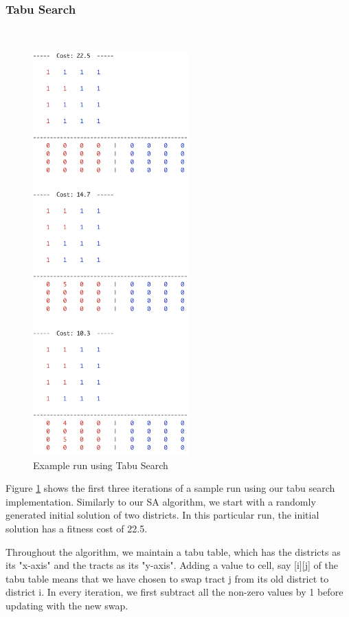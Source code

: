 \documentclass[journal]{IEEEtran}
\begin{document}
\subsubsection{Tabu Search}~\\
\begin{figure}[h!]
    \includegraphics[width=6cm]{tabu.png}
    \centering
    \caption{Example run using Tabu Search}
        \label{fig:tabu_example}
\end{figure}
Figure \ref{fig:tabu_example} shows the first three iterations of a sample run using our tabu search implementation. Similarly to our SA algorithm, we start with a randomly generated initial solution of two districts. In this particular run, the initial solution has a fitness cost of 22.5.

Throughout the algorithm, we maintain a tabu table, which has the districts as its "x-axis" and the tracts as its "y-axis". Adding a value to cell, say [i][j] of the tabu table means that we have chosen to swap tract j from its old district to district i. In every iteration, we first subtract all the non-zero values by 1 before updating with the new swap.
\end{document}
